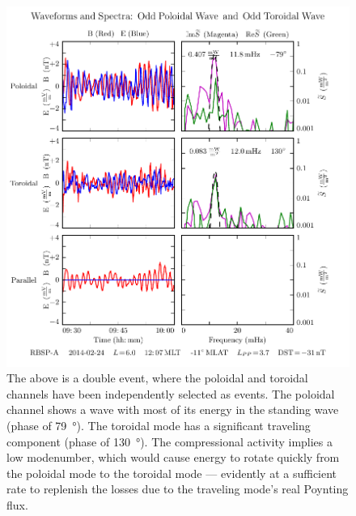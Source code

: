 \begin{figure}[!htb]
    \centering
    \includegraphics[width=\textwidth]{figures/sample_event.pdf}
    \caption[Waveforms and Spectra for a Pc4 Event]{
      The above is a double event, where the poloidal and toroidal channels have been independently selected as events. The poloidal channel shows a wave with most of its energy in the standing wave (phase of \SI{79}{\degree}). The toroidal mode has a significant traveling component (phase of \SI{130}{\degree}). The compressional activity implies a low modenumber, which would cause energy to rotate quickly from the poloidal mode to the toroidal mode --- evidently at a sufficient rate to replenish the losses due to the traveling mode's real Poynting flux. 
    }
    \label{fig_sample_event}
\end{figure}



